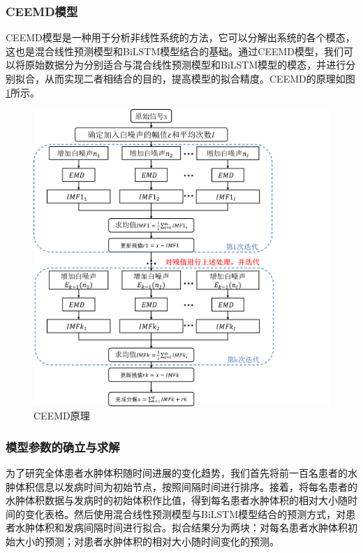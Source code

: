 \documentclass[bwprint]{gmcmthesis}
\begin{document}
\subsubsection{CEEMD模型}
CEEMD模型是一种用于分析非线性系统的方法\cite{yan2020novel}，它可以分解出系统的各个模态，这也是混合线性预测模型和BiLSTM模型结合的基础。通过CEEMD模型，我们可以将原始数据分为分别适合与混合线性预测模型和BiLSTM模型的模态，并进行分别拟合，从而实现二者相结合的目的，提高模型的拟合精度。CEEMD的原理如图\ref{fig:CEEMD原理}所示。
\begin{figure}[h]
    \centering
    \includegraphics[width = \linewidth]{figures/CEEMD原理图.png}
    \caption{CEEMD原理}
    \label{fig:CEEMD原理}
\end{figure}


\subsubsection{模型参数的确立与求解}
为了研究全体患者水肿体积随时间进展的变化趋势，我们首先将前一百名患者的水肿体积信息以发病时间为初始节点，按照间隔时间进行排序。接着，将每名患者的水肿体积数据与发病时的初始体积作比值，得到每名患者水肿体积的相对大小随时间的变化表格。然后使用混合线性预测模型与BiLSTM模型结合的预测方式，对患者水肿体积和发病间隔时间进行拟合。拟合结果分为两块：对每名患者水肿体积初始大小的预测；对患者水肿体积的相对大小随时间变化的预测。
\end{document}
